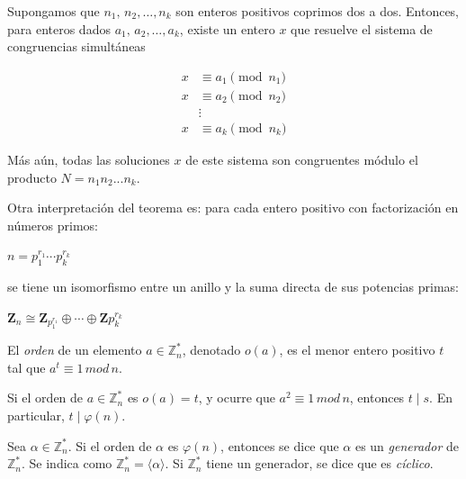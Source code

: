 \begin{theorem}
	
	\hfil 
	
	Supongamos que $n_1,\, n_2, …, n_k$
	son enteros positivos coprimos dos a dos. Entonces, para enteros dados $a_1,\, a_2, …, a_k$, existe un
	entero $x$ que resuelve el sistema de congruencias simultáneas
	
	\begin{align*}
	x &\equiv a_1 \pmod{n_1} \\
	x &\equiv a_2 \pmod{n_2} \\
	&\vdots \\
	x &\equiv a_k \pmod{n_k}
	\end{align*}
	
	Más aún, todas las soluciones $x$ de este sistema son congruentes módulo el
	producto $N = n_1 n_2 ... n_k$.
	
	Otra interpretación del teorema es: para cada entero positivo con factorización en números primos:
	
	$n = p_1^{r_1}\cdots p_k^{r_k}$
	
	se tiene un isomorfismo entre un anillo y la suma directa de sus potencias primas:
	
	$\mathbf{Z}_n \cong \mathbf{Z}_{p_1^{r_1}} \oplus \cdots \oplus \mathbf{Z}{p_k^{r_k}}$

\end{theorem}


\hfil

\begin{definition}
	El \textit{orden} de un elemento $a \in \mathbb{Z}^*_n$, denotado $o(a)$, es el menor entero positivo $t$ tal que $a^t \equiv 1 \, mod \, n$.
\end{definition}

\begin{proposition}
	Si el orden de $a \in \mathbb{Z}^*_n$ es $o(a)=t$, y ocurre que $a^2 \equiv 1 \, mod \, n$, entonces $t \mid s$. En particular, $t\mid \varphi(n)$.
\end{proposition}


\begin{definition}
	Sea $\alpha \in \mathbb{Z}^*_n$. Si el orden de $\alpha$ es $\varphi(n)$, entonces se dice que $\alpha$ es un \textit{generador} de $\mathbb{Z}^*_n$. Se indica como $\mathbb{Z}^*_n = \langle \alpha \rangle $. Si $\mathbb{Z}^*_n$ tiene un generador, se dice que es \textit{cíclico}.
\end{definition}

